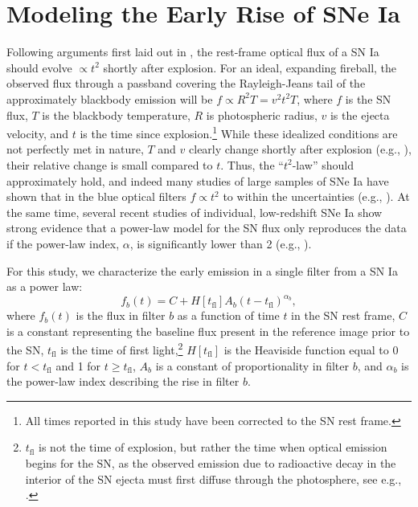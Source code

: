 \documentclass[twocolumn]{aastex63}
\begin{document}
\section{Modeling the Early Rise of SNe Ia}\label{sec:model}

Following arguments first laid out in \citet{Riess99a}, the rest-frame optical
flux of a SN Ia should evolve $\propto t^2$ shortly after explosion. For an
ideal, expanding fireball, the observed flux through a passband covering the
Rayleigh-Jeans tail of the approximately blackbody emission will be $f \propto
R^2 T = v^2 t^2 T$, where $f$ is the SN flux, $T$ is the blackbody
temperature, $R$ is photospheric radius, $v$ is the ejecta velocity, and $t$
is the time since explosion.\footnote{All times reported in this study have
been corrected to the SN rest frame.} While these idealized conditions are not
perfectly met in nature, $T$ and $v$ clearly change shortly after explosion
(e.g., \citealt{Parrent12}), their relative change is small compared to $t$.
Thus, the ``$t^2$-law'' should approximately hold, and indeed many studies of
large samples of SNe Ia have shown that in the blue optical filters $f \propto
t^2$ to within the uncertainties (e.g., \citealt{Conley06, Hayden10,
Ganeshalingam11}). At the same time, several recent studies of individual,
low-redshift SNe Ia show strong evidence that a power-law model for the SN
flux only reproduces the data if the power-law index, $\alpha$, is
significantly lower than 2 (e.g.,
\citealt{Zheng13,Zheng14,Shappee16,Miller18,Fausnaugh19,Dimitriadis19}).

For this study, we characterize the early emission in a single filter from a
SN Ia as a power law:
%
\begin{equation}
    f_b(t) = C + H[t_\mathrm{fl}] A_b (t - t_\mathrm{fl})^{\alpha_b},
    \label{eqn:flux_model}
\end{equation}
%
where $f_b(t)$ is the flux in filter $b$ as a function of time $t$ in the SN
rest frame, $C$ is a constant representing the baseline flux present in the
reference image prior to the SN, $t_\mathrm{fl}$ is the time of first
light,\footnote{$t_\mathrm{fl}$ is not the time of explosion, but rather the
time when optical emission begins for the SN, as the observed emission due to
radioactive decay in the interior of the SN ejecta must first diffuse through
the photosphere, see e.g., \citet{Piro13,Piro14}.} $H[t_\mathrm{fl}]$ is the
Heaviside function equal to 0 for $t < t_\mathrm{fl}$ and 1 for $t \ge
t_\mathrm{fl}$, $A_b$ is a constant of proportionality in filter $b$, and
$\alpha_b$ is the power-law index describing the rise in filter $b$.
\end{document}
